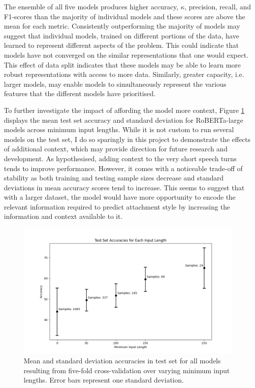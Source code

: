\documentclass[12pt]{report}
\begin{document}
The ensemble of all five models produces higher accuracy, $\kappa$, precision, recall, and F1-scores than the majority of individual models and these scores are above the mean for each metric.
Consistently outperforming the majority of models may suggest that individual models, trained on different portions of the data, have learned to represent different aspects of the problem.
This could indicate that models have not converged on the similar representations that one would expect.
This effect of data split indicates that these models may be able to learn more robust representations with access to more data.
Similarly, greater capacity, i.e. larger models, may enable models to simultaneously represent the various features that the different models have prioritised.

To further investigate the impact of affording the model more context, Figure \ref{fig: roberta-large results} displays the mean test set accuracy and standard deviation for RoBERTa-large models across minimum input lengths.
While it is not custom to run several models on the test set, I do so sparingly in this project to demonstrate the effects of additional context, which may provide direction for future research and development.
As hypothesised, adding context to the very short speech turns tends to improve performance.
However, it comes with a noticeable trade-off of stability as both training and testing sample sizes decrease and standard deviations in mean accuracy scores tend to increase.
This seems to suggest that with a larger dataset, the model would have more opportunity to encode the relevant information required to predict attachment style by increasing the information and context available to it.

\begin{figure}
    \includegraphics[width=\textwidth]{figures/roberta-large_acc_for_min_len.png}
    \caption{Mean and standard deviation accuracies in test set for all models resulting from five-fold cross-validation over varying minimum input lengths. Error bars represent one standard deviation.}
    \label{fig: roberta-large results}
\end{figure}
\end{document}
